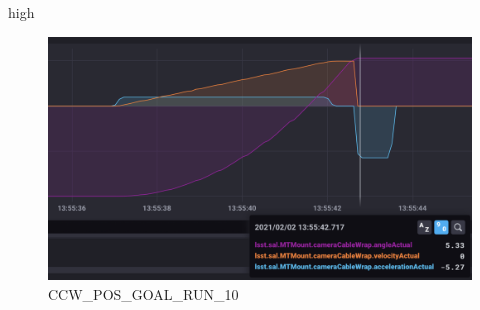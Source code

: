 high\documentclass[SE,lsstdraft,authoryear,toc]{lsstdoc}
\begin{document}
\begin{figure}[h!]
  \includegraphics[width=\linewidth]{media/CCW_high_speed_pos_test10.png}
  \caption{CCW\_POS\_GOAL\_RUN\_10}
  \label{fig:CCW_POS_GOAL_RUN_10}
\end{figure}
\end{document}
